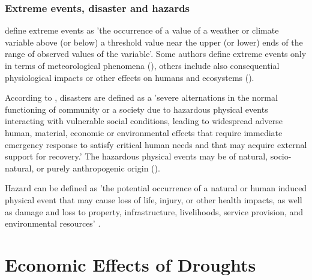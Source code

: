 \documentclass[a4paper,12pt]{article}
\begin{document}
\subsubsection*{Extreme events, disaster and hazards}
\cite{IPCC2012ch1} define extreme events as 'the occurrence of a value of a weather or climate variable above (or below) a threshold value near the upper (or lower) ends of the range of observed values of the variable'. Some authors define extreme events only in terms of meteorological phenomena (\citealp{easterling2000, Jentsch2007}), others include also consequential physiological impacts or other effects on humans and ecosystems (\citealp{IPCC2012ch1, young2002}).


According to \cite{IPCC2012ch1}, disasters are defined as a 'severe alternations in the normal functioning of community or a society due to hazardous physical events interacting with vulnerable social conditions, leading to widespread adverse human, material, economic or environmental effects that require immediate emergency response to satisfy critical human needs and that may acquire external support for recovery.' The hazardous physical events may be of natural, socio-natural, or purely anthropogenic origin (\citealp{IPCC2012ch1, wisner2004risk}).

Hazard can be defined as 'the potential occurrence of a natural or human induced
physical event that may cause loss of life, injury, or other
health impacts, as well as damage and loss to property, infrastructure,
livelihoods, service provision, and environmental resources' \citet{IPCC2012ch1}.

 \section*{Economic Effects of Droughts}
 
\end{document}
